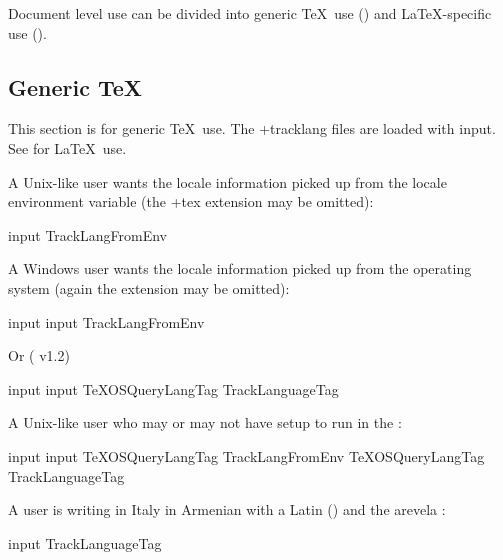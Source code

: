 \documentclass[titlepage=false,oneside,
 fontsize=12pt,captions=tableheading]{scrbook}
\begin{document}
Document level use can be divided into generic \TeX\ use 
() and \LaTeX-specific use ().

\subsection{Generic \texorpdfstring{\TeX}{TeX}}
\label{sec:tex}

This section is for generic \TeX\ use. The \sty+{tracklang} files are
loaded with \gls{input}. See  for \LaTeX\ use.

A Unix-like user wants the locale information picked up from the 
locale environment variable (the \ext+{tex} extension may be omitted):
\begin{codebox*}
\gls{input}  
\gls{TrackLangFromEnv}
\end{codebox*}

A Windows user wants the locale information picked up from the 
operating system (again the  extension may be omitted):
\begin{codebox*}
\gls{input} 
\gls{input}  
\gls{TrackLangFromEnv}
\end{codebox*}
Or ( v1.2)
\begin{codebox*}
\gls{input}  
\gls{input}  
\codepar
\gls{TeXOSQueryLangTag}
\gls{TrackLanguageTag}
\end{codebox*}
A Unix-like user who may or may not have  setup to run in the
:
\begin{codebox*}
\gls{input} 
\gls{input}  
\codepar
{}\gls{TeXOSQueryLangTag}
 \gls{TrackLangFromEnv}
 \gls{TeXOSQueryLangTag}
 \gls{TrackLanguageTag}
\end{codebox*}

A user is writing in Italy in Armenian with a Latin
 () and the arevela :
\begin{codebox*}
\gls{input}  
\gls{TrackLanguageTag}
\end{codebox*}
\end{document}
